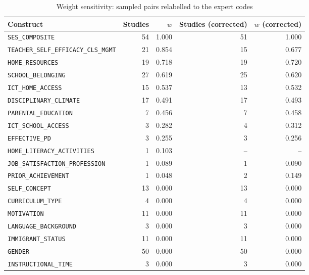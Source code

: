 \begin{table}[htbp]
\centering
\footnotesize
\caption{Weight sensitivity: sampled pairs relabelled to the expert codes}
\label{tab:C7}
\begin{tabular}{lrrrr}
\toprule
Construct & Studies & $w$ & Studies (corrected) & $w$ (corrected) \\
\midrule
\texttt{SES\_COMPOSITE} & 54 & 1.000 & 51 & 1.000 \\
\texttt{TEACHER\_SELF\_EFFICACY\_CLS\_MGMT} & 21 & 0.854 & 15 & 0.677 \\
\texttt{HOME\_RESOURCES} & 19 & 0.718 & 19 & 0.720 \\
\texttt{SCHOOL\_BELONGING} & 27 & 0.619 & 25 & 0.620 \\
\texttt{ICT\_HOME\_ACCESS} & 15 & 0.537 & 13 & 0.532 \\
\texttt{DISCIPLINARY\_CLIMATE} & 17 & 0.491 & 17 & 0.493 \\
\texttt{PARENTAL\_EDUCATION} & 7 & 0.456 & 7 & 0.458 \\
\texttt{ICT\_SCHOOL\_ACCESS} & 3 & 0.282 & 4 & 0.312 \\
\texttt{EFFECTIVE\_PD} & 3 & 0.255 & 3 & 0.256 \\
\texttt{HOME\_LITERACY\_ACTIVITIES} & 1 & 0.103 & -- & -- \\
\texttt{JOB\_SATISFACTION\_PROFESSION} & 1 & 0.089 & 1 & 0.090 \\
\texttt{PRIOR\_ACHIEVEMENT} & 1 & 0.048 & 2 & 0.149 \\
\texttt{SELF\_CONCEPT} & 13 & 0.000 & 13 & 0.000 \\
\texttt{CURRICULUM\_TYPE} & 4 & 0.000 & 4 & 0.000 \\
\texttt{MOTIVATION} & 11 & 0.000 & 11 & 0.000 \\
\texttt{LANGUAGE\_BACKGROUND} & 3 & 0.000 & 3 & 0.000 \\
\texttt{IMMIGRANT\_STATUS} & 11 & 0.000 & 11 & 0.000 \\
\texttt{GENDER} & 50 & 0.000 & 50 & 0.000 \\
\texttt{INSTRUCTIONAL\_TIME} & 3 & 0.000 & 3 & 0.000 \\
\bottomrule
\end{tabular}
\par{}
\end{table}
